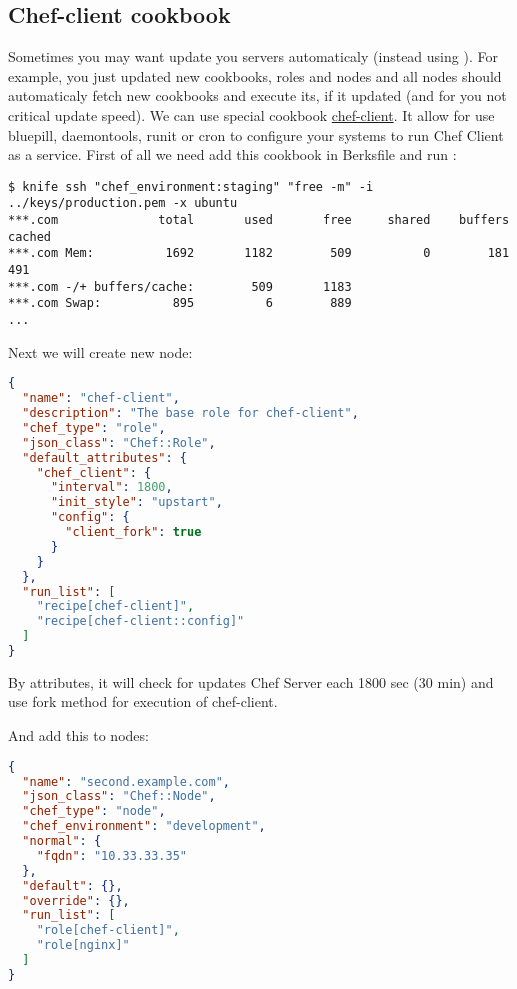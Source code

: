 \subsection{Chef-client cookbook}

Sometimes you may want update you servers automaticaly (instead using ). For example, you just updated new cookbooks, roles and nodes and all nodes should automaticaly fetch new cookbooks and execute its, if it updated (and for you not critical update speed). We can use special cookbook \href{http://community.opscode.com/cookbooks/chef-client}{chef-client}. It allow for use bluepill, daemontools, runit or cron to configure your systems to run Chef Client as a service. First of all we need add this cookbook in Berksfile and run :

\begin{lstlisting}[label=lst:my-server-cloud-knife-ssh6,title=my-server-cloud/Berksfile]
$ knife ssh "chef_environment:staging" "free -m" -i ../keys/production.pem -x ubuntu
***.com              total       used       free     shared    buffers     cached
***.com Mem:          1692       1182        509          0        181        491
***.com -/+ buffers/cache:        509       1183
***.com Swap:          895          6        889
...
\end{lstlisting}

Next we will create new node:

\begin{lstlisting}[language=JSON,label=lst:my-server-cloud-knife-ssh7,title=my-server-cloud/roles/chef-client.json]
{
  "name": "chef-client",
  "description": "The base role for chef-client",
  "chef_type": "role",
  "json_class": "Chef::Role",
  "default_attributes": {
    "chef_client": {
      "interval": 1800,
      "init_style": "upstart",
      "config": {
        "client_fork": true
      }
    }
  },
  "run_list": [
    "recipe[chef-client]",
    "recipe[chef-client::config]"
  ]
}
\end{lstlisting}

By attributes, it will check for updates Chef Server each 1800 sec (30 min) and use fork method for execution of chef-client.

And add this to nodes:

\begin{lstlisting}[language=JSON,label=lst:my-server-cloud-knife-ssh8,title=my-server-cloud/nodes/second.example.com.json]
{
  "name": "second.example.com",
  "json_class": "Chef::Node",
  "chef_type": "node",
  "chef_environment": "development",
  "normal": {
    "fqdn": "10.33.33.35"
  },
  "default": {},
  "override": {},
  "run_list": [
    "role[chef-client]",
    "role[nginx]"
  ]
}
\end{lstlisting}

